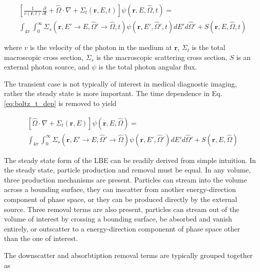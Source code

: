 \begin{equation} \label{eq:boltz_t_dep}
\begin{split}
	&\left[ \frac{1}{v(\boldsymbol{r},t)} \frac{\partial}{\partial t} + \hat{\Omega} \cdot \nabla + \Sigma_t(\boldsymbol{r}, E, t) \right]
	\psi(\boldsymbol{r}, E, \hat{\Omega}, t) = \\
	&\int_{4 \pi} \int_0^\infty \Sigma_s(\boldsymbol{r}, E' \rightarrow E, \hat{\Omega}' \rightarrow \hat{\Omega}, t) \psi(\boldsymbol{r}, E', \hat{\Omega}', t) dE' d\hat{\Omega}' + S(\boldsymbol{r}, E, \hat{\Omega}, t)
\end{split}
\end{equation}

\noindent
where $v$ is the velocity of the photon in the medium at $\boldsymbol{r}$, $\Sigma_t$ is the total macroscopic cross section, $\Sigma_s$ is the macroscopic scattering cross section, $S$ is an external photon source, and $\psi$ is the total photon angular flux. 

The transient case is not typically of interest in medical diagnostic imaging, rather the steady state is more important. The time dependence in Eq. \ref{eq:boltz_t_dep} is removed to yield

\begin{equation} \label{eq:boltz}
\begin{split}
	&\left[ \hat{\Omega} \cdot \nabla + \Sigma_t(\boldsymbol{r}, E) \right]
	\psi(\boldsymbol{r}, E, \hat{\Omega}) = \\
	&\int_{4 \pi} \int_0^\infty \Sigma_s(\boldsymbol{r}, E' \rightarrow E, \hat{\Omega}' \rightarrow \hat{\Omega}) \psi(\boldsymbol{r}, E', \hat{\Omega}') dE' d\hat{\Omega}' + S(\boldsymbol{r}, E, \hat{\Omega})
\end{split}
\end{equation}

The steady state form of the LBE can be readily derived from simple intuition. In the steady state, particle production and removal must be equal. In any volume, three production mechanisms are present. Particles can stream into the volume across a bounding surface, they can inscatter from another energy-direction component of phase space, or they can be produced directly by the external source. Three removal terms are also present, particles can stream out of the volume of interest by crossing a bounding surface, be absorbed and vanish entirely, or outscatter to a energy-direction componennt of phase space other than the one of interest.

The downscatter and absorbtiption removal terms are typically grouped together as

